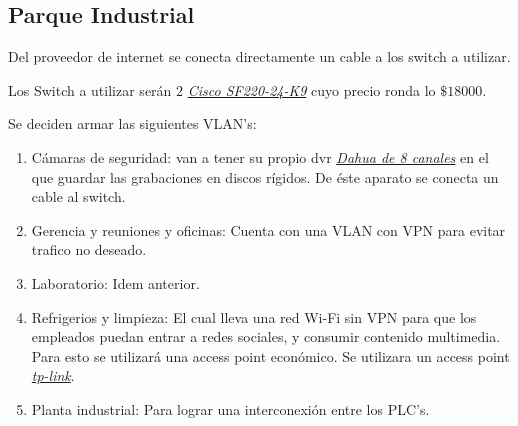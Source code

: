 \documentclass[11pt]{article}
\begin{document}
    \subsection{Parque Industrial}

        Del proveedor de internet se conecta directamente un cable a los switch a utilizar. 

        Los Switch a utilizar serán $2$ \href{https://articulo.mercadolibre.com.ar/MLA-714545399-switch-cisco-semi-admin-24-puertos-10100-2-giga-sf220-24-k9-_JM#position=34&type=item&tracking_id=4df4b6b4-1084-45cf-bab2-a07d312cf877}{\textit{Cisco SF220-24-K9}}
        cuyo precio ronda lo $\$18000$.


        Se deciden armar las siguientes VLAN's: 

        \begin{enumerate}
            \item Cámaras de seguridad: van a tener su propio dvr 
            \href{https://articulo.mercadolibre.com.ar/MLA-658975031-dvr-xvr-dahua-8ch-canales-hd-1080n-cooper-pentahibrido-p2p-_JM#reco_item_pos=0&reco_backend=machinalis-seller-items-pdp&reco_backend_type=low_level&reco_client=vip-seller_items-above&reco_id=5b1ef3a8-b109-48d2-8d27-f2781047b33d}{\textit{Dahua de 8 canales}}
            en el que guardar las grabaciones en discos rígidos. De éste aparato se conecta un cable al switch.
            \item Gerencia y reuniones y oficinas: Cuenta con una VLAN con VPN para evitar trafico no deseado.
            \item Laboratorio: Idem anterior.
            \item Refrigerios y limpieza: El cual lleva una red Wi-Fi sin VPN para que los empleados puedan entrar a redes sociales, y 
                consumir contenido multimedia. Para esto se utilizará una access point económico.
                Se utilizara un access point 
                \href{https://www.mercadolibre.com.ar/access-point-router-tp-link-archer-c80-negro-1-unidad/p/MLA15904250?pdp_filters=category:MLA430901%7CCONNECTION_TYPE:279958#searchVariation=MLA15904250&position=2&type=product&tracking_id=d8d0e6d5-6d3c-4d79-9478-ce1d3aa1232d}{\textit{tp-link}}.
            \item Planta industrial: Para lograr una interconexión entre los PLC's.
        \end{enumerate}
\end{document}
